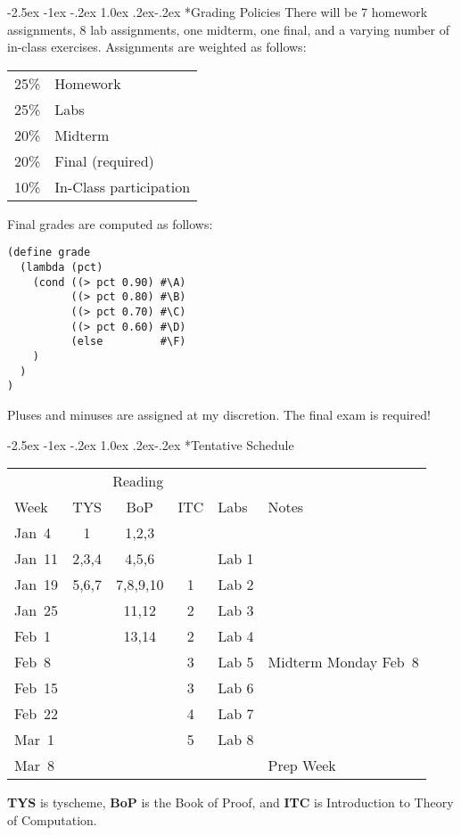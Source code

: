 \documentclass[letterpaper,12pt]{article}
\makeatletter
\renewcommand\section{%
  \@startsection {section}{1}{\z@}%
  {-2.5ex \@plus -1ex \@minus -.2ex}%
  {1.0ex \@plus.2ex\@minus-.2ex}%
  {\normalfont\Large\bfseries}}
\makeatother
\begin{document}
\section*{Grading Policies}
There will be 7 homework assignments, 8 lab assignments, one midterm, one final,
and a varying number of in-class exercises.  Assignments are weighted as
follows: 

\begin{center}
  \begin{tabular}[t]{ll}
    25\% & Homework \\
    25\% & Labs\\
    20\% & Midterm\\
    20\% & Final (required) \\
    10\% & In-Class participation\\
  \end{tabular}
\end{center}

Final grades are computed as follows:
\begin{verbatim}
(define grade 
  (lambda (pct)
    (cond ((> pct 0.90) #\A)
          ((> pct 0.80) #\B)
          ((> pct 0.70) #\C)
          ((> pct 0.60) #\D)
          (else         #\F)
    )
  )
)
\end{verbatim}
Pluses and minuses are assigned at my discretion.  The final exam is required! 


\section*{Tentative Schedule}

\begin{center}
  \begin{tabular}{l|ccc|l|l}
    & \multicolumn{3}{c|}{Reading} & & \\
    Week   & TYS   & BoP      & ITC & Labs  & Notes \\\hline
    Jan~4  & 1     & 1,2,3    &     &       &       \\
    Jan~11 & 2,3,4 & 4,5,6    &     & Lab 1 &       \\
    Jan~19 & 5,6,7 & 7,8,9,10 &  1  & Lab 2 &       \\
    Jan~25 &       & 11,12    &  2  & Lab 3 &       \\
    Feb~1  &       & 13,14    &  2  & Lab 4 &       \\
    Feb~8  &       &          &  3  & Lab 5 & Midterm Monday Feb~8\\
    Feb~15 &       &          &  3  & Lab 6 &       \\
    Feb~22 &       &          &  4  & Lab 7 &       \\
    Mar~1  &       &          &  5  & Lab 8 &       \\
    Mar~8  &       &          &     &       & Prep Week\\
  \end{tabular}
\end{center}
\textbf{TYS} is tyscheme, \textbf{BoP} is the Book of Proof, and \textbf{ITC} is
Introduction to Theory of Computation.  
\end{document}
